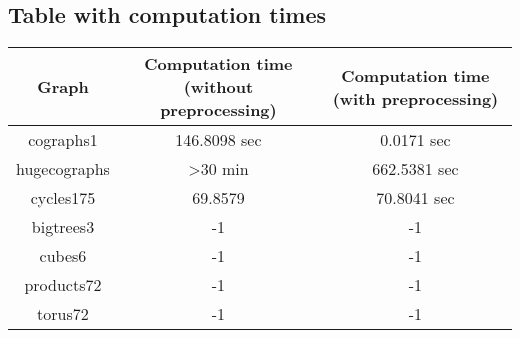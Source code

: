 \documentclass[twoside]{article}
\theoremstyle{definition}
\theoremstyle{plain}
\begin{document}
\begin{appendices}
\section{Table with computation times}
\begin{tabular}{c|c|c}
Graph & Computation time (without preprocessing) & Computation time (with preprocessing) \\
\hline
cographs1 & 146.8098 sec & 0.0171 sec \\
hugecographs & >30 min & 662.5381 sec \\
cycles175 & 69.8579 & 70.8041 sec \\
bigtrees3 & -1 & -1\\
cubes6 & -1 & -1\\
products72 & -1 & -1\\
torus72 & -1 & -1\\

\end{tabular}
\end{appendices}
\end{document}
